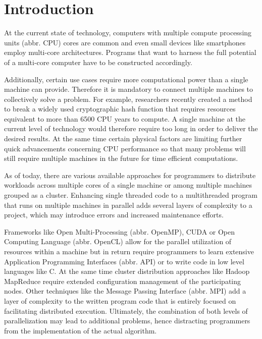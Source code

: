 \chapter{Introduction}
\label{intro}
At the current state of technology, computers with multiple compute processing units (abbr. CPU) cores are common and even small devices like smartphones employ multi-core architectures\cite{arm_big_little}. Programs that want to harness the full potential of a multi-core computer have to be constructed accordingly.

Additionally, certain use cases require more computational power than a single machine can provide. Therefore it is mandatory to connect multiple machines to collectively solve a problem. For example, researchers recently created a method to break a widely used cryptographic hash function that requires resources equivalent to more than 6500 CPU years to compute\cite{shattered}. A single machine at the current level of technology would therefore require too long in order to deliver the desired results. At the same time certain physical factors are limiting further quick advancements concerning CPU performance\cite{end_of_moores_law}\cite{end_of_silicon} so that many problems will still require multiple machines in the future for time efficient computations.

As of today, there are various available approaches for programmers to distribute workloads across multiple cores of a single machine or among multiple machines grouped as a cluster. Enhancing single threaded code to a multithreaded program that runs on multiple machines in parallel adds several layers of complexity to a project, which may introduce errors and increased maintenance efforts.

Frameworks like Open Multi-Processing (abbr. OpenMP), CUDA or Open Computing Language (abbr. OpenCL) allow for the parallel utilization of resources within a machine but in return require programmers to learn extensive Application Programming Interfaces (abbr. API) or to write code in low level languages like C.
At the same time cluster distribution approaches like Hadoop MapReduce require extended configuration management of the participating nodes. Other techniques like the Message Passing Interface (abbr. MPI) add a layer of complexity to the written program code that is entirely focused on facilitating distributed execution.
Ultimately, the combination of both levels of parallelization may lead to additional problems, hence distracting programmers from the implementation of the actual algorithm.

